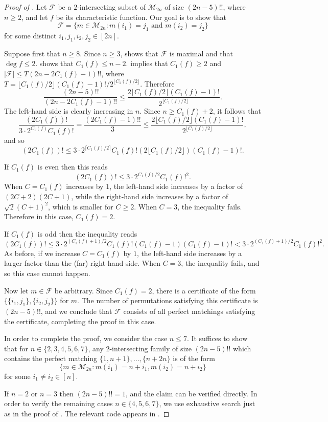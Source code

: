\documentclass[10pt,a4paper]{amsart}
\providecommand{\cM}{\mathcal{M}}
\begin{document}
\begin{proof}[Proof of ]
Let $\mathcal{F}$ be a $2$-intersecting subset of $\cM_{2n}$ of size $(2n-5)!!$, where $n \geq 2$, and let $f$ be its characteristic function. Our goal is to show that
\[
 \mathcal{F} = \{ m \in \cM_{2n} : m(i_1) = j_1 \text{ and } m(i_2) = j_2 \}
\]
for some distinct $i_1,j_1,i_2,j_2 \in [2n]$.

Suppose first that $n \geq 8$. Since $n \geq 3$,  shows that $\mathcal{F}$ is maximal and that $\deg f \leq 2$.  shows that $C_1(f) \leq n-2$.  implies that $C_1(f) \geq 2$ and  $|\mathcal{F}| \leq T (2n - 2C_1(f) - 1)!!$, where $T = \lfloor C_1(f)/2 \rfloor (C_1(f) - 1)!/2^{\lfloor C_1(f)/2 \rfloor}$. Therefore
\[
 \frac{(2n-5)!!}{(2n - 2C_1(f) - 1)!!} \leq \frac{2\lfloor C_1(f)/2 \rfloor (C_1(f) - 1)!}{2^{\lfloor C_1(f)/2 \rfloor}}.
\]
The left-hand side is clearly increasing in $n$. Since $n \geq C_1(f) + 2$, it follows that
\[
 \frac{(2C_1(f))!}{3 \cdot 2^{C_1(f)} C_1(f)!} =
 \frac{(2C_1(f) - 1)!!}{3} \leq \frac{2\lfloor C_1(f)/2 \rfloor (C_1(f) - 1)!}{2^{\lfloor C_1(f)/2 \rfloor}},
\]
and so 
\[
 (2C_1(f))! \leq 3 \cdot 2^{\lceil C_1(f)/2 \rceil} C_1(f)! (2\lfloor C_1(f)/2 \rfloor) (C_1(f) - 1)!.
\]

If $C_1(f)$ is even then this reads
\[
 (2C_1(f))! \leq 3 \cdot 2^{C_1(f)/2} C_1(f)!^2.
\]
When $C = C_1(f)$ increases by $1$, the left-hand side increases by a factor of $(2C+2)(2C+1)$, while the right-hand side increases by a factor of $\sqrt{2} (C+1)^2$, which is smaller for $C \geq 2$. When $C = 3$, the inequality fails. Therefore in this case, $C_1(f) = 2$.

If $C_1(f)$ is odd then the inequality reads
\[
 (2C_1(f))! \leq 3 \cdot 2^{(C_1(f)+1)/2} C_1(f)! (C_1(f) - 1)(C_1(f) - 1)! < 3 \cdot 2^{(C_1(f)+1)/2} C_1(f)!^2.
\]
As before, if we increase $C = C_1(f)$ by $1$, the left-hand side increases by a larger factor than the (far) right-hand side. When $C = 3$, the inequality fails, and so this case cannot happen.

Now let $m \in \mathcal{F}$ be arbitrary. Since $C_1(f) = 2$, there is a certificate of the form $\bigl\{\{i_1,j_1\},\{i_2,j_2\}\bigr\}$ for $m$. The number of permutations satisfying this certificate is $(2n-5)!!$, and we conclude that $\mathcal{F}$ consists of all perfect matchings satisfying the certificate, completing the proof in this case.

\smallskip

In order to complete the proof, we consider the case $n \leq 7$. It suffices to show that for $n \in \{2,3,4,5,6,7\}$, any $2$-intersecting family of size $(2n-5)!!$ which contains the perfect matching $\{1,n+1\},\ldots,\{n+2n\}$ is of the form
\[
 \{ m \in \cM_{2n} : m(i_1) = n + i_1, m(i_2) = n + i_2 \}
\]
for some $i_1 \neq i_2 \in [n]$.

If $n = 2$ or $n = 3$ then $(2n-5)!! = 1$, and the claim can be verified directly. In order to verify the remaining cases $n \in \{4,5,6,7\}$, we use exhaustive search just as in the proof of . The relevant code appears in .
\end{proof}
\end{document}

